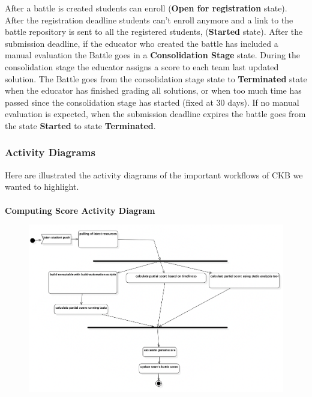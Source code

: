 After a battle is created students can enroll (\textbf{Open for registration} state). After the registration deadline students can't enroll anymore and a link to the battle repository is sent to all the registered students, (\textbf{Started} state). After the submission deadline, if the educator who created the battle has included a manual evaluation the Battle goes in a \textbf{Consolidation Stage} state. During the consolidation stage the educator assigns a score to each team last updated solution. The Battle goes from the consolidation stage state to \textbf{Terminated} state when the educator has finished grading all solutions, or when too much time has passed since the consolidation stage has started (fixed at 30 days). If no manual evaluation is expected, when the submission deadline expires the battle goes from the state \textbf{Started} to state \textbf{Terminated}.
\clearpage

\subsubsection{Activity Diagrams}
Here are illustrated the activity diagrams of the important workflows of CKB we wanted to highlight.\\
\\
\textbf{Computing Score Activity Diagram}\\
\begin{figure}[h]
    \clearpage
    \centering
    \includegraphics[width=1\textwidth]{2Overall_Description/res/newestActDgPush.png}
\end{figure}


